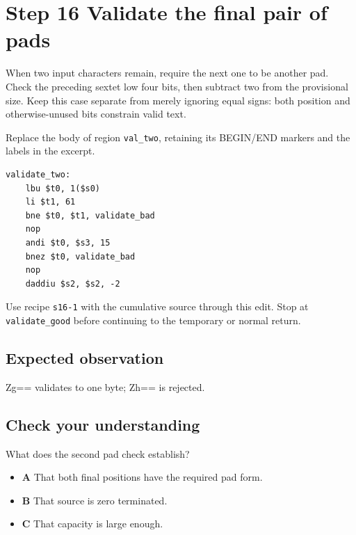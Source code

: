 \section{Step 16 Validate the final pair of pads}\label{base64-s16}

When two input characters remain, require the next one to be another pad. Check the preceding sextet low four bits, then subtract two from the provisional size. Keep this case separate from merely ignoring equal signs: both position and otherwise-unused bits constrain valid text.

Replace the body of region \texttt{val\_two}, retaining its BEGIN/END markers and the labels in the excerpt.

\begin{verbatim}
validate_two:
    lbu $t0, 1($s0)
    li $t1, 61
    bne $t0, $t1, validate_bad
    nop
    andi $t0, $s3, 15
    bnez $t0, validate_bad
    nop
    daddiu $s2, $s2, -2
\end{verbatim}

Use recipe \texttt{s16-1} with the cumulative source through this edit. Stop at \texttt{validate\_good} before continuing to the temporary or normal return.

\subsection{Expected observation}
Zg== validates to one byte; Zh== is rejected.

\subsection{Check your understanding}
What does the second pad check establish?

\begin{itemize}
  \item \textbf{A} That both final positions have the required pad form.
  \item \textbf{B} That source is zero terminated.
  \item \textbf{C} That capacity is large enough.
\end{itemize}
